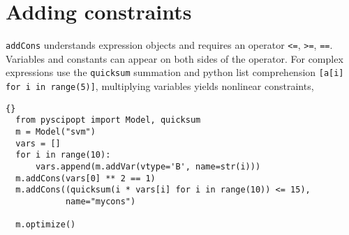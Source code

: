 \documentclass[11pt]{article}
\newcommand\ttt\texttt
\begin{document}
\section*{Adding constraints}

\ttt{addCons} understands expression objects and requires an operator \ttt{<=}, \ttt{>=}, \ttt{==}. Variables and constants can appear on both sides of the operator.
For complex expressions use the \ttt{quicksum} summation and python list comprehension \ttt{[a[i] for i in range(5)]}, multiplying variables yields nonlinear constraints,

\begin{lstlisting}[frame=tb]{}
  from pyscipopt import Model, quicksum
  m = Model("svm")
  vars = []
  for i in range(10):
      vars.append(m.addVar(vtype='B', name=str(i)))
  m.addCons(vars[0] ** 2 == 1)
  m.addCons((quicksum(i * vars[i] for i in range(10)) <= 15),
            name="mycons")

  m.optimize()
\end{lstlisting}
\end{document}
